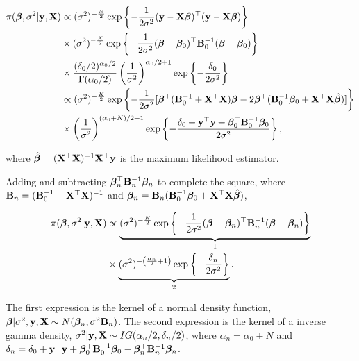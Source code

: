 \begin{align*}
	\pi(\bm{\beta},\sigma^2|\mathbf{y},\mathbf{X})&\propto (\sigma^2)^{-\frac{N}{2}} \exp \left\{-\frac{1}{2\sigma^2} ({\bf{y}} - {\bf{X}}\bm{\beta})^{\top}({\bf{y}} - {\bf{X}}\bm{\beta}) \right\} \\
	& \times (\sigma^2)^{-\frac{K}{2}} \exp \left\{-\frac{1}{2\sigma^2} (\bm{\beta} - \bm{\beta}_0)^{\top}{\bf{B}}_0^{-1}(\bm{\beta} - \bm{\beta}_0)\right\} \\
	& \times \frac{(\delta_0/2)^{\alpha_0/2}}{\Gamma(\alpha_0/2)}\left(\frac{1}{\sigma^2}\right)^{\alpha_0/2+1}\exp \left\{-\frac{\delta_0}{2\sigma^2} \right\} \\
	& \propto (\sigma^2)^{-\frac{K}{2}} \exp \left\{-\frac{1}{2\sigma^2} [\bm{\beta}^{\top}({\bf{B}}_0^{-1} + {\bf{X}}^{\top}{\bf{X}})\bm{\beta} - 2\bm{\beta}^{\top}({\bf{B}}_0^{-1}\bm{\beta}_0 + {\bf{X}}^{\top}{\bf{X}}\hat{\bm{\beta}})] \right\} \\
	& \times \left(\frac{1}{\sigma^2}\right)^{(\alpha_0+N)/2+1}\exp \left\{-\frac{\delta_0+ {\bf{y}}^{\top}{\bf{y}} + \bm{\beta}_0^{\top}{\bf{B}}_0^{-1}\bm{\beta}_0}{2\sigma^2} \right\},
\end{align*}

where $\hat{\bm{\beta}}=({\bf{X}}^{\top}{\bf{X}})^{-1}{\bf{X}}^{\top}{\bf{y}}$ is the maximum likelihood estimator.

Adding and subtracting $\bm{\beta}_n^{\top}{{\bf{B}}}_n^{-1} \bm{\beta}_n$ to complete the square, where ${{\bf{B}}}_n = ({\bf{B}}_0^{-1} + {\bf{X}}^{\top}{\bf{X}})^{-1}$ and $\bm{\beta}_n = {{\bf{B}}}_n({\bf{B}}_0^{-1}\bm{\beta}_0 + {\bf{X}}^{\top}{\bf{X}}\hat{\bm{\beta}})$,

\begin{align*}
	\pi(\bm{\beta},\sigma^2|\mathbf{y},\mathbf{X})&\propto \underbrace{(\sigma^2)^{-\frac{K}{2}} \exp \left\{-\frac{1}{2\sigma^2} (\bm{\beta}-\bm{\beta}_n)^{\top}{\bf{B}}^{-1}_n(\bm{\beta}-\bm{\beta}_n) \right\}}_1 \\
	& \times \underbrace{(\sigma^2)^{-\left(\frac{\alpha_n}{2}+1 \right)} \exp \left\{-\frac{\delta_n}{2\sigma^2} \right\}}_2.
\end{align*}

The first expression is the kernel of a normal density function, $\bm{\beta}|\sigma^2, {\bf{y}}, {\bf{X}} \sim N(\bm{\beta}_n, \sigma^2{\bf{B}}_n)$. The second expression is the kernel of a inverse gamma density,	$\sigma^2| {\bf{y}}, {\bf{X}}\sim IG(\alpha_n/2, \delta_n/2)$, where $\alpha_n = \alpha_0 + N$ and $\delta_n = \delta_0 + {\bf{y}}^{\top}{\bf{y}} + \bm{\beta}_0^{\top}{\bf{B}}_0^{-1}\bm{\beta}_0 - \bm{\beta}_n^{\top}{\bf{B}}_n^{-1}\bm{\beta}_n$.


